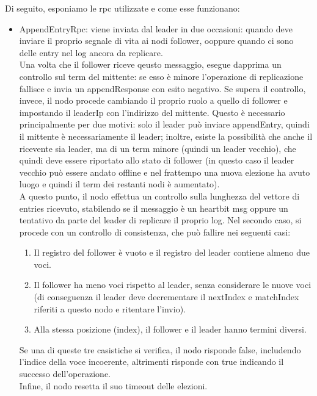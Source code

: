 Di seguito, esponiamo le rpc utilizzate e come esse funzionano:
\begin{itemize}
  \item AppendEntryRpc: viene inviata dal leader in due occasioni: quando deve inviare il proprio segnale di vita ai 
    nodi follower, ooppure quando ci sono delle entry nel log ancora da replicare. \\
    Una volta che il follower riceve qeusto messaggio, esegue dapprima un controllo sul term del mittente: se esso è minore l'operazione
    di replicazione fallisce e invia un appendResponse con esito negativo. Se supera il controllo, invece, il nodo 
    procede cambiando il proprio ruolo a quello di follower e impostando il leaderIp con l'indirizzo del mittente. Questo 
    è necessario principalmente per due motivi: solo il leader può inviare appendEntry, quindi il mittente è necessariamente il leader;
    inoltre, esiste la possibilità che anche il ricevente sia leader, ma di un term minore (quindi un leader vecchio), che
    quindi deve essere riportato allo stato di follower (in questo caso il leader vecchio può essere andato offline e 
    nel frattempo una nuova elezione ha avuto luogo e quindi il term dei restanti nodi è aumentato). \\
    A questo punto, il nodo effettua un controllo sulla lunghezza del vettore di entries ricevuto, stabilendo 
    se il messaggio è un heartbit msg oppure un tentativo da parte del leader di replicare il proprio
    log. Nel secondo caso, si procede con un controllo di consistenza, che può fallire nei seguenti casi:
    \begin{enumerate}
      \item Il registro del follower è vuoto e il registro del leader contiene almeno due voci.
      \item Il follower ha meno voci rispetto al leader, senza considerare le nuove voci 
        (di conseguenza il leader deve decrementare il nextIndex e matchIndex riferiti a questo nodo e ritentare l'invio).
      \item Alla stessa posizione (index), il follower e il leader hanno termini diversi.
    \end{enumerate} 
    Se una di queste tre casistiche si verifica, il nodo risponde false, includendo l'indice della voce incoerente, altrimenti
    risponde con true indicando il successo dell'operazione. \\
    Infine, il nodo resetta il suo timeout delle elezioni.


\end{itemize}
